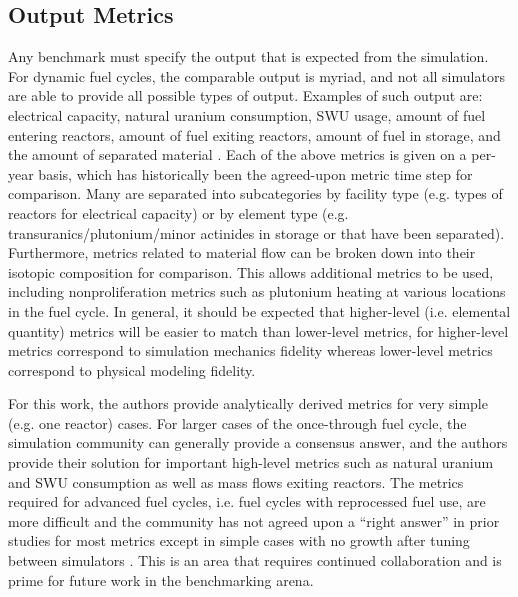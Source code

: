 \documentclass{anstrans}
\begin{document}
\subsection{Output Metrics}
Any benchmark must specify the output that is expected from the simulation. For
dynamic fuel cycles, the comparable output is myriad, and not all simulators are
able to provide all possible types of output. Examples of such output are:
electrical capacity, natural uranium consumption, SWU usage, amount of fuel
entering reactors, amount of fuel exiting reactors, amount of fuel in storage,
and the amount of separated material
\cite{boucher_specification_2008}\cite{guerin_benchmark_2009}. Each of the above
metrics is given on a per-year basis, which has historically been the
agreed-upon metric time step for comparison. Many are separated into
subcategories by facility type (e.g. types of reactors for electrical capacity)
or by element type (e.g. transuranics/plutonium/minor actinides in storage or
that have been separated). Furthermore, metrics related to material flow can be
broken down into their isotopic composition for comparison. This allows
additional metrics to be used, including nonproliferation metrics such as
plutonium heating at various locations in the fuel cycle. In general, it should
be expected that higher-level (i.e. elemental quantity) metrics will be easier
to match than lower-level metrics, for higher-level metrics correspond to
simulation mechanics fidelity whereas lower-level metrics correspond to physical
modeling fidelity.

For this work, the authors provide analytically derived metrics for very simple
(e.g. one reactor) cases. For larger cases of the once-through fuel cycle, the
simulation community can generally provide a consensus answer, and the authors
provide their solution for important high-level metrics such as natural uranium
and SWU consumption as well as mass flows exiting reactors. The metrics required
for advanced fuel cycles, i.e. fuel cycles with reprocessed fuel use, are more
difficult and the community has not agreed upon a ``right answer'' in prior
studies for most metrics except in simple cases with no growth after tuning
between simulators \cite{guerin_benchmark_2009}. This is an area that requires
continued collaboration and is prime for future work in the benchmarking arena.

\end{document}
